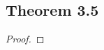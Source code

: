 \documentclass[../../main.tex]{subfiles}
\begin{document}
\subsection{Theorem 3.5}
\begin{wts}

\end{wts}
\begin{proof}

\end{proof}
\end{document}
